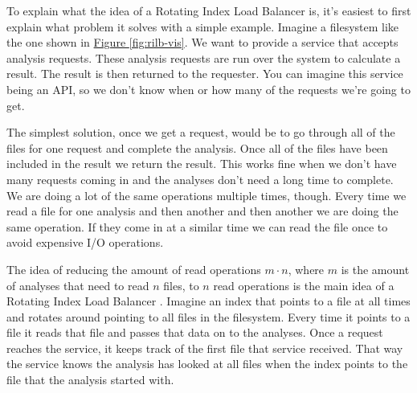 \documentclass[11pt]{article} %
\newcommand{\rilb}{Rotating Index Load Balancer }
\newcommand{\hidelinks}[1]{{\hypersetup{hidelinks}#1}}
\newcommand{\figref}[1]{\hidelinks{\hyperref[#1]{Figure \ref{#1}}}}
\begin{document}
  To explain what the idea of a \rilb is, it's easiest to first explain what problem it solves with a simple example. Imagine a filesystem like the one shown in \figref{fig:rilb-vis}. We want to provide a service that accepts analysis requests. These analysis requests are run over the system to calculate a result. The result is then returned to the requester. You can imagine this service being an API, so we don't know when or how many of the requests we're going to get.

  The simplest solution, once we get a request, would be to go through all of the files for one request and complete the analysis. Once all of the files have been included in the result we return the result. This works fine when we don't have many requests coming in and the analyses don't need a long time to complete. We are doing a lot of the same operations multiple times, though. Every time we read a file for one analysis and then another and then another we are doing the same operation. If they come in at a similar time we can read the file once to avoid expensive I/O operations.

  The idea of reducing the amount of read operations $m \cdot n$, where $m$ is the amount of analyses that need to read $n$ files, to $n$ read operations is the main idea of a \rilb. Imagine an index that points to a file at all times and rotates around pointing to all files in the filesystem. Every time it points to a file it reads that file and passes that data on to the analyses. Once a request reaches the service, it keeps track of the first file that service received. That way the service knows the analysis has looked at all files when the index points to the file that the analysis started with.
\end{document}

